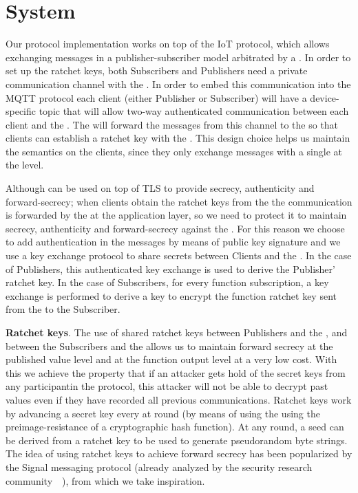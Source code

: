 \section{System}
\label{sec:system}

Our protocol implementation works on top of the IoT \MQTT{} protocol, which
allows exchanging messages in a publisher-subscriber model arbitrated by a
\broker.  In order to set up the ratchet keys, both Subscribers and Publishers
need a private communication channel with the \garbler.  In order to embed
this communication into the MQTT protocol each client (either Publisher or
Subscriber) will have a device-specific topic that will allow two-way
authenticated communication between each client and the \broker.  The \broker
will forward the messages from this channel to the \garbler so that clients
can establish a ratchet key with the \garbler.  This design choice helps us
maintain the \MQTT{} semantics on the clients, since they only exchange
messages with a single \broker at the \MQTT{} level.

Although \MQTT{} can be used on top of TLS to provide secrecy, authenticity and
forward-secrecy; when clients obtain the ratchet keys from the \garbler
the communication is forwarded by the \broker at the application layer, so we
need to protect it to maintain secrecy, authenticity and forward-secrecy
against the \broker.  For this reason we choose to add authentication in the
\MQTT{} messages by means of public key signature and we use a key exchange
protocol to share secrets between Clients and the \garbler.  In the case of
Publishers, this authenticated key exchange is used to derive the Publisher'
ratchet key.  In the case of Subscribers, for every function subscription, a
key exchange is performed to derive a key to encrypt the function ratchet key
sent from the \garbler to the Subscriber.

\noindent\textbf{Ratchet keys}.  The use of shared ratchet keys between
Publishers and the \garbler, and between the Subscribers and the \garbler
allows us to maintain forward secrecy at the published value level and at the
function output level at a very low cost.  With this we achieve the property
that if an attacker gets hold of the secret keys from any participantin the
protocol, this attacker will not be able to decrypt past values even if they
have recorded all previous communications.  Ratchet keys work by advancing a
secret key every at round (by means of using the using the preimage-resistance
of a cryptographic hash function).  At any round, a seed can be derived from a
ratchet key to be used to generate pseudorandom byte strings.  The idea of
using ratchet keys to achieve forward secrecy has been popularized by the
Signal messaging protocol (already analyzed by the security research
community~\cite{signal1}~\cite{signal2}), from which we take inspiration.

